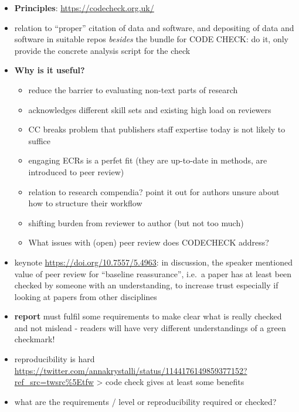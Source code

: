 \documentclass[12pt]{article}
\begin{document}
\begin{itemize}
\item
  \textbf{Principles}: \url{https://codecheck.org.uk/}
\item
  relation to ``proper'' citation of data and software, and depositing
  of data and software in suitable repos \emph{besides} the bundle for
  CODE CHECK: do it, only provide the concrete analysis script for the
  check
\item
  \textbf{Why is it useful?}

  \begin{itemize}
  \item
    reduce the barrier to evaluating non-text parts of research
  \item
    acknowledges different skill sets and existing high load on
    reviewers
  \item
    CC breaks problem that publishers staff expertise today is not
    likely to suffice
  \item
    engaging ECRs is a perfet fit (they are up-to-date in methods, are
    introduced to peer review)
  \item
    relation to research compendia? point it out for authors unsure
    about how to structure their workflow
  \item
    shifting burden from reviewer to author (but not too much)
  \item
    What issues with (open) peer review does CODECHECK address?
  \end{itemize}
\item
  keynote \url{https://doi.org/10.7557/5.4963}: in discussion, the
  speaker mentioned value of peer review for ``baseline reassurance'',
  i.e.~a paper has at least been checked by someone with an
  understanding, to increase trust especially if looking at papers from
  other disciplines
\item
  \textbf{report} must fulfil some requirements to make clear what is
  really checked and not mislead - readers will have very different
  understandings of a green checkmark!
\item
  reproducibility is hard
  \url{https://twitter.com/annakrystalli/status/1144176149859377152?ref_src=twsrc\%5Etfw}
  \textgreater{} code check gives at least some benefits
\item
  what are the requirements / level or reproducibility required or
  checked?


\end{itemize}
\end{document}
